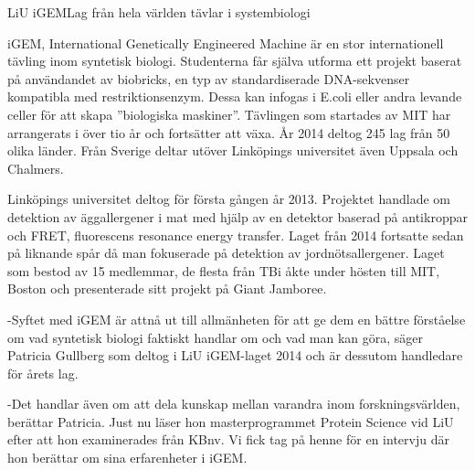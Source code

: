 \begin{news}{1}{LiU iGEM}{Lag från hela världen tävlar i systembiologi}{}{}

iGEM, International Genetically Engineered Machine är en stor
internationell tävling inom syntetisk biologi. Studenterna får själva
utforma ett projekt baserat på användandet av biobricks, en typ av
standardiserade DNA-sekvenser kompatibla med restriktionsenzym. Dessa
kan infogas i E.coli eller andra levande celler för att skapa
”biologiska maskiner”. Tävlingen som startades av MIT har arrangerats
i över tio år och fortsätter att växa. År 2014 deltog 245 lag från 50
olika länder. Från Sverige deltar utöver Linköpings universitet även
Uppsala och Chalmers.





Linköpings universitet deltog för första gången år 2013. Projektet
handlade om detektion av äggallergener i mat med hjälp av en detektor
baserad på antikroppar och FRET, fluorescens resonance energy
transfer. Laget från 2014 fortsatte sedan på liknande spår då man
fokuserade på detektion av jordnötsallergener. Laget som bestod av 15
medlemmar, de flesta från TBi åkte under hösten till MIT, Boston och
presenterade sitt projekt på Giant Jamboree.

-Syftet med iGEM är attnå ut till allmänheten för att ge dem en bättre 
förståelse om vad syntetisk biologi faktiskt handlar om och vad man kan göra, 
säger Patricia Gullberg som deltog i LiU iGEM-laget 2014 och är dessutom 
handledare för årets lag.  

-Det handlar även om att dela kunskap mellan varandra inom forskningsvärlden, 
berättar Patricia. Just nu läser hon masterprogrammet Protein Science vid LiU 
efter att hon examinerades från KBnv. Vi fick tag på henne för en intervju 
där hon berättar om sina erfarenheter i iGEM.
\end {news}


